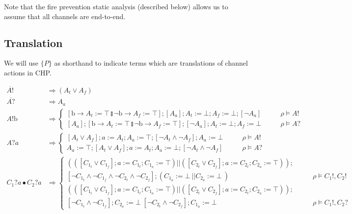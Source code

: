 \documentclass[times, 10pt]{article}
\begin{document}
Note that the fire prevention static analysis (described below) allows us to assume that all
channels are end-to-end.

\subsection{Translation}

We will use $\{P\}$ as shorthand to indicate terms which are translations of
channel actions in CHP.

\begin{align*}
    \overline{A!} & \Rightarrow (A_t \vee A_f) \\
    \overline{A?} & \Rightarrow A_a \\
    A!\mathrm{b} & \Rightarrow \left\{ \begin{matrix} [\mathrm{b} \rightarrow A_t := \top \talloblong \neg \mathrm{b} \rightarrow A_f := \top]; [A_a]; A_t := \bot; A_f := \bot; [\neg A_a] & \qquad \rho \vDash A! \\
                                                      [A_a]; [\mathrm{b} \rightarrow A_t := \top \talloblong \neg \mathrm{b} \rightarrow A_f := \top]; [\neg A_a]; A_t := \bot; A_f := \bot & \qquad \rho \vDash A? \end{matrix} \right. \\
    A?a & \Rightarrow \left\{ \begin{matrix} [A_t \vee A_f]; a := A_t; A_a := \top; [\neg A_t \wedge \neg A_f]; A_a := \bot & \qquad \rho \vDash A! \\
                                             A_a := \top; [A_t \vee A_f]; a := A_t; A_a := \bot; [\neg A_t \wedge \neg A_f] & \qquad \rho \vDash A? \end{matrix} \right. \\
    C_1?a \bullet C_2?a & \Rightarrow \left\{ \begin{matrix} (([C_{1_t} \vee C_{1_f}]; a := C_{1_t}; C_{1_a} := \top) || ([C_{2_t} \vee C_{2_f}]; a := C_{2_t}; C_{2_a} := \top)); 
    \\ [\neg C_{1_t} \wedge \neg C_{1_f} \wedge \neg C_{2_t} \wedge \neg C_{2_f}]; (C_{1_a} := \bot\ ||C_{2_a} := \bot\ ) & \qquad \rho \vDash C_1!, C_2! \\
    (([C_{1_t} \vee C_{1_f}]; a := C_{1_t}; C_{1_a} := \top) || ([C_{2_t} \vee C_{2_f}]; a := C_{2_t}; C_{2_a} := \top)); 
    \\ [\neg C_{1_t} \wedge \neg C_{1_f}];  C_{2_a} := \bot\; [ \neg C_{2_t} \wedge \neg C_{2_f}]; C_{1_a} := \bot\ & \qquad \rho \vDash C_1!, C_2?

\end{matrix}
\end{align*}
\end{document}

